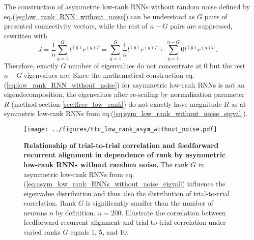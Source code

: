 \documentclass[11pt]{article}
\begin{document}
	The construction of asymmetric low-rank RNNs without random noise defined by eq.(\ref{eq:low_rank_RNN_without_noise}) can be understood as $G$ pairs of presented connectivity vectors, while the rest of $n-G$ pairs are suppressed, rewritten with
		\begin{equation} \label{eq:asym_low_rank_RNNs_without_noise_eigval}
			J = \frac{1}{n} \sum_{g=1}^{G} l^{(g)} r^{(g)T} = \sum_{g=1}^{G} \frac{1}{n} l^{(g)} r^{(g)T} + \sum_{g=1}^{n-G} 0 l^{(g)} r^{(g)T} \, .
		\end{equation}
	Therefore, exactly $G$ number of eigenvalues do not concentrate at $0$ but the rest $n-G$ eigenvalues are. Since the mathematical construction eq.(\ref{eq:low_rank_RNN_without_noise}) for asymmetric low-rank RNNs is not an eigendecomposition, the eigenvalues after re-scaling by normalization parameter $R$ (method section \ref{sec:ffrec_low_rank}) do not exactly have magnitude $R$ as at symmetric low-rank RNNs from eq.(\ref{eq:sym_low_rank_without_noise_eigval}).	
	
		\begin{figure}[H]
			\centering
			\texttt{[image: ../figures/ttc\_low\_rank\_asym\_without\_noise.pdf]}
			\caption[Relationship of trial-to-trial correlation and feedforward recurrent alignment in dependence of rank by asymmetric low-rank RNNs without random noise]{\textbf{Relationship of trial-to-trial correlation and feedforward recurrent alignment in dependence of rank by asymmetric low-rank RNNs without random noise.} The rank $G$ in asymmetric low-rank RNNs from eq.(\ref{eq:asym_low_rank_RNNs_without_noise_eigval}) influence the eigenvalue distribution and thus also the distribution of trial-to-trial correlation. Rank $G$ is significantly smaller than the number of neurons $n$ by definition. $n=200$. Illustrate the correlation between feedforward recurrent alignment and trial-to-trial correlation under varied ranks $G$ equals $1$, $5$, and $10$.} 
			\label{fig:ttc_asym_low_rank_RNN_without_noise}
		\end{figure}
	
\end{document}
